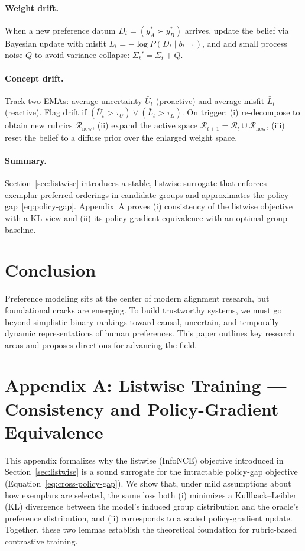 \documentclass[sigconf]{acmart}
\begin{document}
\paragraph{Weight drift.}
When a new preference datum \(D_t=(y_A^\ast \succ y_B^\ast)\) arrives, update the belief via Bayesian update with misfit \(L_t=-\log P(D_t\mid b_{t-1})\), and add small process noise \(Q\) to avoid variance collapse: \(\Sigma_t'=\Sigma_t+Q\).

\paragraph{Concept drift.}
Track two EMAs: average uncertainty \(\bar U_t\) (proactive) and average misfit \(\bar L_t\) (reactive). Flag drift if \((\bar U_t>\tau_U)\lor(\bar L_t>\tau_L)\). On trigger: (i) re-decompose to obtain new rubrics \(\mathcal{R}_{\mathrm{new}}\), (ii) expand the active space \(\mathcal{R}_{t+1}=\mathcal{R}_t\cup \mathcal{R}_{\mathrm{new}}\), (iii) reset the belief to a diffuse prior over the enlarged weight space.

\paragraph{Summary.}
Section~\ref{sec:listwise} introduces a stable, listwise surrogate that enforces exemplar-preferred orderings in candidate groups and approximates the policy-gap~\eqref{eq:policy-gap}. Appendix~A proves (i) consistency of the listwise objective with a KL view and (ii) its policy-gradient equivalence with an optimal group baseline.


\section{Conclusion}

Preference modeling sits at the center of modern alignment research, but foundational cracks are emerging. To build trustworthy systems, we must go beyond simplistic binary rankings toward causal, uncertain, and temporally dynamic representations of human preferences. This paper outlines key research areas and proposes directions for advancing the field.

\section*{Appendix A: Listwise Training — Consistency and Policy-Gradient Equivalence}

This appendix formalizes why the listwise (InfoNCE) objective introduced in
Section~\ref{sec:listwise} is a sound surrogate for the intractable
policy-gap objective (Equation~\ref{eq:cross-policy-gap}).
We show that, under mild assumptions about how exemplars are selected, the same loss both  
(i) minimizes a Kullback–Leibler (KL) divergence between the model’s induced
group distribution and the oracle’s preference distribution, and  
(ii) corresponds to a scaled policy-gradient update.
Together, these two lemmas establish the theoretical foundation for
rubric-based contrastive training.
\end{document}
